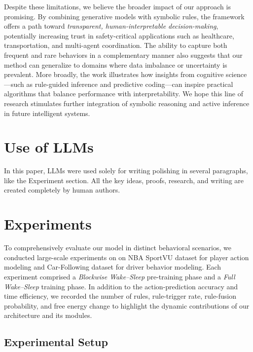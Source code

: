 \documentclass{article} %
\begin{document}
Despite these limitations, we believe the broader impact of our approach is
promising. By combining generative models with symbolic rules, the framework
offers a path toward \emph{transparent, human-interpretable decision-making},
potentially increasing trust in safety-critical applications such as healthcare,
transportation, and multi-agent coordination. The ability to capture both
frequent and rare behaviors in a complementary manner also suggests that our
method can generalize to domains where data imbalance or uncertainty is
prevalent. More broadly, the work illustrates how insights from cognitive
science---such as rule-guided inference and predictive coding---can inspire
practical algorithms that balance performance with interpretability. We hope
this line of research stimulates further integration of symbolic reasoning and
active inference in future intelligent systems.

\section{Use of LLMs}
\label{appendix_sec:use_of_llms}

In this paper, LLMs were used solely for writing polishing in several paragraphs, like the Experiment section. All the key ideas, proofs, research, and writing are created completely by human authors.

\iffalse
\section{Experiments}
\label{sec:experiments}

To comprehensively evaluate our model in distinct behavioral scenarios, we conducted large-scale experiments on on NBA SportVU dataset for player action modeling and Car-Following dataset for driver behavior modeling. Each experiment comprised a \emph{Blockwise Wake–Sleep} pre-training phase and a \emph{Full Wake–Sleep} training phase. In addition to the action-prediction accuracy and time efficiency, we recorded the number of rules, rule-trigger rate, rule-fusion probability, and free energy change to highlight the dynamic contributions of our architecture and its modules.

\subsection{Experimental Setup}
\end{document}
